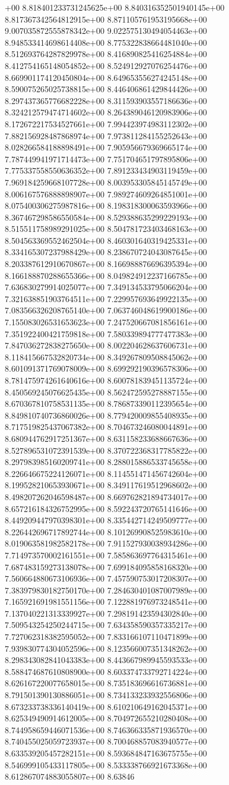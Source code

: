 +00	8.818401233731245625e+00	8.840316352501940145e+00	8.817367342564812915e+00	8.871105761953195668e+00	9.007035872555878342e+00	9.022575130494054463e+00	8.948533414698614408e+00	8.775322838664481040e+00	8.512693764287829978e+00	8.416890825416254884e+00	8.412754165148054852e+00	8.524912927076254476e+00	8.669901174120450804e+00	8.649653556274245148e+00	8.590075265025738815e+00	8.446406861429844426e+00	8.297437365776682228e+00	8.311593903557186636e+00	8.324212579474714602e+00	8.264389046120983906e+00	8.172672217534527661e+00	7.994423974983112302e+00	7.882156928487868974e+00	7.973811284155252643e+00	8.028266584188898491e+00	7.905956679369665174e+00	7.787449941971714473e+00	7.751704651797895806e+00	7.775337558550636352e+00	7.891233434903119459e+00	7.969184259668107728e+00	8.003953305845145749e+00	8.006167576888898907e+00	7.989274609264851001e+00	8.075400306275987816e+00	8.198318300063593966e+00	8.367467298586550584e+00	8.529388635299229193e+00	8.515511758989291025e+00	8.504781723403468163e+00	8.504563369552462504e+00	8.460301640319425331e+00	8.334165307237988429e+00	8.238670724043087645e+00	8.203387612910670867e+00	8.166988876696395394e+00	8.166188870288655366e+00	8.049824912237166785e+00	7.636830279914025077e+00	7.349134533795066204e+00	7.321638851903764511e+00	7.229957693649922135e+00	7.083566326208765140e+00	7.063746048619900186e+00	7.155083026531653623e+00	7.247520667081856161e+00	7.351922400421759818e+00	7.580339894777477383e+00	7.847036272838275650e+00	8.002204628637606731e+00	8.118415667532820734e+00	8.349267809508845062e+00	8.601091371769078009e+00	8.699292190396578306e+00	8.781475974261640616e+00	8.600781839451135724e+00	8.450569245076625435e+00	8.562472595278887155e+00	8.670367810758531135e+00	8.786873390112395654e+00	8.849810740736860026e+00	8.779420009855408935e+00	8.717519825437067382e+00	8.704673246080044891e+00	8.680944762917251367e+00	8.631158233688667636e+00	8.527896531072391539e+00	8.370722368317785822e+00	8.297983985160209741e+00	8.288015886533745658e+00	8.226646675224126071e+00	8.114551471456742604e+00	8.199528210653930671e+00	8.349117619512968602e+00	8.498207262046598487e+00	8.669762821894734017e+00	8.657216184326752995e+00	8.592243720765141646e+00	8.449209447970398301e+00	8.335442714249509777e+00	8.226442696717892744e+00	8.101269908525983610e+00	8.019063581982582178e+00	7.911527930038934286e+00	7.714973570002161551e+00	7.585863697764315461e+00	7.687483159273138078e+00	7.699184095858168320e+00	7.560664880673106936e+00	7.457590753017208307e+00	7.383979830182750170e+00	7.284630401087007989e+00	7.165921691981551156e+00	7.122881976973248541e+00	7.137040221313339927e+00	7.298191423594302840e+00	7.509543254250244715e+00	7.634358590357335217e+00	7.727062318382595052e+00	7.833166107110471899e+00	7.939830774304052596e+00	8.123566007351348262e+00	8.298343082841043383e+00	8.443667989945593533e+00	8.588474687610808900e+00	8.603374733792714224e+00	8.626167220077658015e+00	8.735183696616736881e+00	8.791501390130886051e+00	8.734133233932556806e+00	8.673233738336140419e+00	8.610210649162045371e+00	8.625349490914612005e+00	8.704972655210280408e+00	8.744958659446071536e+00	8.746366335871936570e+00	8.740455025059723937e+00	8.700468857083940577e+00	8.633539205457282151e+00	8.593684847163675755e+00	8.546999105433117805e+00	8.533338766921673368e+00	8.612867074883055807e+00	8.63846